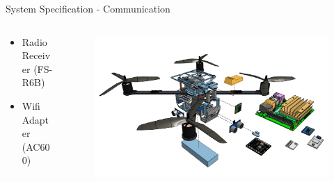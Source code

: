 \begin{frame}{System Specification - Communication}


    \begin{columns}
        \begin{column}{0.4\textwidth}
        \begin{itemize}
            \item Radio Receiver (FS-R6B)
            \item Wifi Adapter (AC600)
        \end{itemize}
        \end{column}
        \begin{column}{0.6\textwidth}  %
            \begin{figure}
                \centering
                \includegraphics[width=1\textwidth]{img/exploded-comms.png}
                \label{fig:comms}
            \end{figure}
        \end{column}
    \end{columns}
\end{frame}
